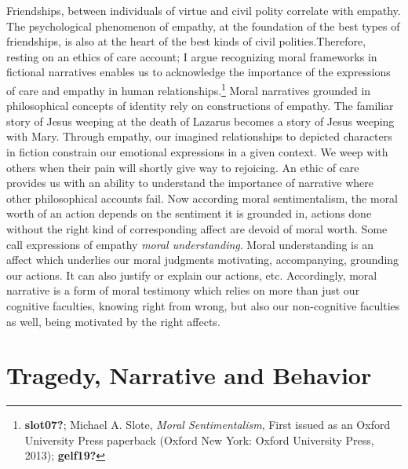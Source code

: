 \documentclass[phdthesis,12pt,final]{wuthesis}
\theoremstyle{definition}
\theoremstyle{definition}
\theoremstyle{definition}
\theoremstyle{definition}
\theoremstyle{remark}
\begin{document}
Friendships, between individuals of virtue and civil polity correlate with empathy. The psychological phenomenon of empathy, at the foundation of the best types of friendships, is also at the heart of the best kinds of civil polities.Therefore, resting on an ethics of care account; I argue recognizing moral frameworks in fictional narratives enables us to acknowledge the importance of the expressions of care and empathy in human relationships.\footnote{\textbf{slot07?}; Michael A. Slote, \emph{Moral {Sentimentalism}}, First issued as an Oxford University Press paperback (Oxford New York: Oxford University Press, 2013); \textbf{gelf19?}} Moral narratives grounded in philosophical concepts of identity rely on constructions of empathy. The familiar story of Jesus weeping at the death of Lazarus becomes a story of Jesus weeping with Mary. Through empathy, our imagined relationships to depicted characters in fiction constrain our emotional expressions in a given context. We weep with others when their pain will shortly give way to rejoicing. An ethic of care provides us with an ability to understand the importance of narrative where other philosophical accounts fail. Now according moral sentimentalism, the moral worth of an action depends on the sentiment it is grounded in, actions done without the right kind of corresponding affect are devoid of moral worth. Some call expressions of empathy \emph{moral understanding}. Moral understanding is an affect which underlies our moral judgments motivating, accompanying, grounding our actions. It can also justify or explain our actions, etc. Accordingly, moral narrative is a form of moral testimony which relies on more than just our cognitive faculties, knowing right from wrong, but also our non-cognitive faculties as well, being motivated by the right affects.

\section{Tragedy, Narrative and Behavior}\label{tragedy-narrative-and-behavior}
\end{document}
